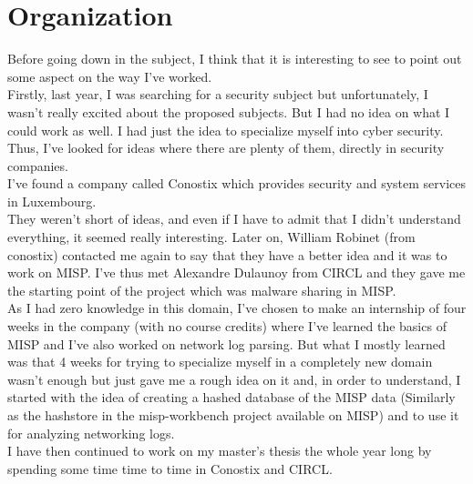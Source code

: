 \documentclass{eplmastersthesis}
\begin{document}
\section{Organization}
Before going down in the subject, I think that it is interesting to see to point out some aspect on the way I've worked.\\
Firstly, last year, I was searching for a security subject but unfortunately, I wasn't really excited about the proposed subjects. But I had no idea on what I could work as well. I had just the idea to specialize myself into cyber security. Thus, I've looked for ideas where there are plenty of them, directly in security companies.\\
I've found a company called Conostix which provides security and system services in Luxembourg.\\
They weren't short of ideas, and even if I have to admit that I didn't understand everything, it seemed really interesting. Later on, William Robinet (from conostix) contacted me again to say that they have a better idea and it was to work on MISP. I've thus met Alexandre Dulaunoy from CIRCL and they gave me the starting point of the project which was malware sharing in MISP.\\

As I had zero knowledge in this domain, I've chosen to make an internship of four weeks in the company (with no course credits) where I've learned the basics of MISP and I've also worked on network log parsing. But what I mostly learned was that 4 weeks for trying to specialize myself in a completely new domain wasn't enough but just gave me a rough idea on it and, in order to understand, I started with the idea of creating a hashed database of the MISP data (Similarly as the hashstore in the misp-workbench project available on MISP) and to use it for analyzing networking logs.\\
I have then continued to work on my master's thesis the whole year long by spending some time time to time in Conostix and CIRCL.
\end{document}
